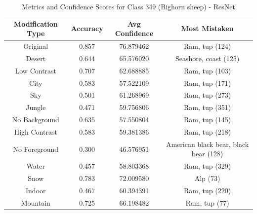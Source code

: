 \begin{table}
	\centering
	\begin{tabular}{|c|c|c|c|}
		\hline
		\textbf{Modification Type} & \textbf{Accuracy} & \textbf{Avg Confidence} & \textbf{Most Mistaken} \\
		\hline
		Original & 0.857 & 76.879462 & Ram, tup (124) \\
		\hline
		Desert & 0.644 & 65.576020 & Seashore, coast (125) \\
		\hline
		Low Contrast & 0.707 & 62.688885 & Ram, tup (103) \\
		\hline
		City & 0.583 & 57.522109 & Ram, tup (171) \\
		\hline
		Sky & 0.501 & 61.268969 & Ram, tup (273) \\
		\hline
		Jungle & 0.471 & 59.756806 & Ram, tup (351) \\
		\hline
		No Background & 0.635 & 57.550804 & Ram, tup (145) \\
		\hline
		High Contrast & 0.583 & 59.381386 & Ram, tup (218) \\
		\hline
		No Foreground & 0.300 & 46.576951 & American black bear, black bear (128) \\
		\hline
		Water & 0.457 & 58.803368 & Ram, tup (329) \\
		\hline
		Snow & 0.783 & 72.009580 & Alp (73) \\
		\hline
		Indoor & 0.467 & 60.394391 & Ram, tup (220) \\
		\hline
		Mountain & 0.725 & 66.198482 & Ram, tup (77) \\
		\hline
	\end{tabular}
	\caption{Metrics and Confidence Scores for Class 349 (Bighorn sheep) - ResNet}
	\label{tab:metrics_confidence_class_349_resnet}
\end{table}

